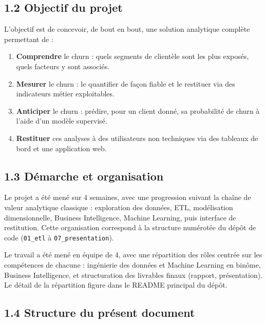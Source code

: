 \documentclass[11pt,a4paper]{article}
\providecommand{\tightlist}{\setlength{\itemsep}{0pt}\setlength{\parskip}{0pt}}
\begin{document}
\hypertarget{objectif-du-projet}{%
\subsection{1.2 Objectif du projet}\label{objectif-du-projet}}

L'objectif est de concevoir, de bout en bout, une solution analytique
complète permettant de :

\begin{enumerate}
\def\labelenumi{\arabic{enumi}.}
\tightlist
\item
  \textbf{Comprendre} le churn : quels segments de clientèle sont les
  plus exposés, quels facteurs y sont associés.
\item
  \textbf{Mesurer} le churn : le quantifier de façon fiable et le
  restituer via des indicateurs métier exploitables.
\item
  \textbf{Anticiper} le churn : prédire, pour un client donné, sa
  probabilité de churn à l'aide d'un modèle supervisé.
\item
  \textbf{Restituer} ces analyses à des utilisateurs non techniques via
  des tableaux de bord et une application web.
\end{enumerate}

\hypertarget{duxe9marche-et-organisation}{%
\subsection{1.3 Démarche et
organisation}\label{duxe9marche-et-organisation}}

Le projet a été mené sur 4 semaines, avec une progression suivant la
chaîne de valeur analytique classique : exploration des données, ETL,
modélisation dimensionnelle, Business Intelligence, Machine Learning,
puis interface de restitution. Cette organisation correspond à la
structure numérotée du dépôt de code (\texttt{01\_\hspace{0pt}etl} à
\texttt{07\_\hspace{0pt}presentation}).

Le travail a été mené en équipe de 4, avec une répartition des rôles
centrée sur les compétences de chacune : ingénierie des données et
Machine Learning en binôme, Business Intelligence, et structuration des
livrables finaux (rapport, présentation). Le détail de la répartition
figure dans le README principal du dépôt.

\hypertarget{structure-du-pruxe9sent-document}{%
\subsection{1.4 Structure du présent
document}\label{structure-du-pruxe9sent-document}}
\end{document}
